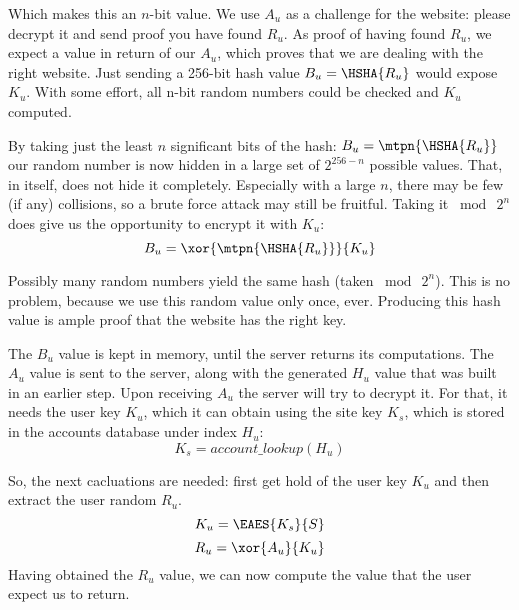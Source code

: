 \par
Which makes this an \(n\)-bit value.
We use \(A_u\) as a challenge for the website: please decrypt it and send proof you have found \(R_u\).
As proof of having found \(R_u\), we expect a value in return of our \(A_u\), which proves that we are dealing with the right website.
Just sending a 256-bit hash value
\(B_u = \HSHA{R_u}\)
would expose \(K_u\).
With some effort, all n-bit random numbers could be checked and \(K_u\) computed.
\par
By taking just the least \(n\) significant bits of the hash:
\(B_u = \mtpn{\HSHA{R_u}}\)
our random number is now hidden in a large set of \(2^{256-n}\) possible values.
That, in itself, does not hide it completely.
Especially with a large \(n\), there may be few (if any) collisions, so a brute force attack may still be fruitful.
Taking it \(\bmod\ 2^n\) does give us the opportunity to encrypt it with \(K_u\):
\begin{equation}\label{rud:bu}
B_u = \xor{\mtpn{\HSHA{R_u}}}{K_u}
\end{equation}
\par
Possibly many random numbers yield the same hash (taken \(\bmod\ 2^n\)).
This is no problem, because we use this random value only once, ever.
Producing this hash value is ample proof that the website has the right key.
\par
The \(B_u\) value is kept in memory, until the server returns its computations.
The \(A_u\) value is sent to the server, along with the generated \(H_u\) value that was built in an earlier step.
Upon receiving \(A_u\) the server will try to decrypt it.
For that, it needs the user key \(K_u\), which it can obtain using the site key \(K_s\), which is stored in the accounts database under index \(H_u\):
\begin{equation}
K_s = account\_lookup(H_u)
\end{equation}
\par
So, the next cacluations are needed: first get hold of the user key \(K_u\) and then extract the user random \(R_u\).
\begin{equation}\label{rud:sku}
K_u = \EAES{K_s}{S}
\end{equation}
\begin{equation}\label{rud:sru}
R_u = \xor{A_u}{K_u}
\end{equation}
Having obtained the \(R_u\) value, we can now compute the value that the user expect us to return.
